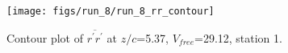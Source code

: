 \begin{figure}[H]
\centering
\texttt{[image: figs/run\_8/run\_8\_rr\_contour]}
\caption{Contour plot of $\overline{r^\prime r^\prime}$ at $z/c$=5.37, $V_{free}$=29.12, station 1.}
\label{fig:run_8_rr_contour}
\end{figure}


